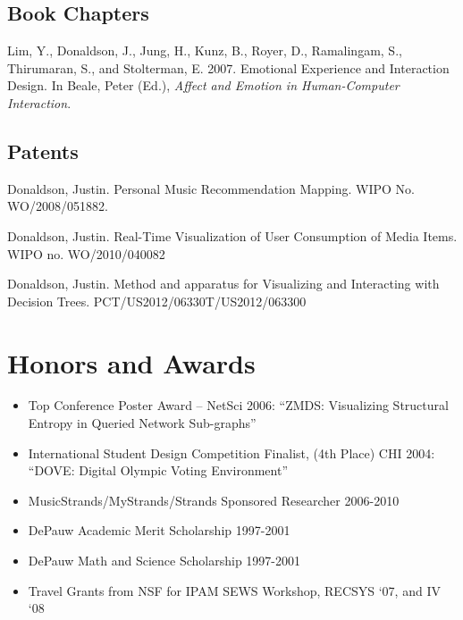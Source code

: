 \documentclass[overlapped,line,letterpaper]{res}
\begin{document}
\begin{resume}
\subsection{\bf Book Chapters}
Lim, Y., Donaldson, J., Jung, H., Kunz, B., Royer, D., Ramalingam, S., Thirumaran, S., and Stolterman, E. 2007. Emotional Experience and Interaction Design. In Beale, Peter (Ed.), \emph{Affect and Emotion in Human-Computer Interaction}.

\subsection{\bf Patents}
Donaldson, Justin. Personal Music Recommendation Mapping. WIPO No. WO/2008/051882.

Donaldson, Justin. Real-Time Visualization of User Consumption of Media Items. WIPO no. WO/2010/040082

Donaldson, Justin. Method and apparatus for Visualizing and Interacting with Decision Trees. PCT/US2012/06330T/US2012/063300

\section{\bf Honors and Awards}
\begin{itemize}
	\item Top Conference Poster Award – NetSci 2006:
	“ZMDS: Visualizing Structural Entropy in Queried Network Sub-graphs”
	\item International Student Design Competition Finalist, (4th Place) CHI 2004:
	“DOVE: Digital Olympic Voting Environment”
	\item MusicStrands/MyStrands/Strands Sponsored Researcher 2006-2010
	\item DePauw Academic Merit Scholarship
	1997-2001
	\item DePauw Math and Science Scholarship
	1997-2001
	\item Travel Grants from NSF for IPAM SEWS Workshop, RECSYS `07, and IV `08

\end{itemize}


\end{resume}
\end{document}
